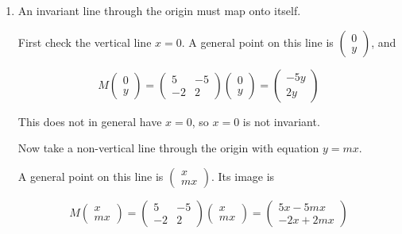 \documentclass[leqno]{article}
\begin{document}
\begin{enumerate}[
  label=\textbf{\arabic*.},
  leftmargin=*,
  topsep=0pt,
  partopsep=0pt,
  parsep=0pt
]
\begin{tcolorbox}[colback=white, colframe=scarlet, title={\textbf{Solution}}, breakable, grow to left by=6mm, grow to right by=10mm]
\begin{enumerate}[label=\textbf{(\alph*)}]
  \[
  \det(M)=
  \begin{vmatrix}
  p+2 & -5\\
  -2 & p-1
  \end{vmatrix}
  =(p+2)(p-1)-(-5)(-2)
  \]

  \[
  \det(M)=(p+2)(p-1)-10=p^2+p-2-10=p^2+p-12
  \]

  Factorising,

  \[
  p^2+p-12=(p+4)(p-3)
  \]

  So \(T\) is not invertible when

  \[
  (p+4)(p-3)=0
  \]

  Hence \(p=3\) or \(p=-4\).

  \item An invariant line through the origin must map onto itself.

  First check the vertical line \(x=0\). A general point on this line is \(\begin{pmatrix}0\\y\end{pmatrix}\), and

  \[
  M\begin{pmatrix}0\\y\end{pmatrix}
  =
  \begin{pmatrix}
  5 & -5\\
  -2 & 2
  \end{pmatrix}
  \begin{pmatrix}0\\y\end{pmatrix}
  =
  \begin{pmatrix}-5y\\2y\end{pmatrix}
  \]

  This does not in general have \(x=0\), so \(x=0\) is not invariant.

  Now take a non-vertical line through the origin with equation \(y=mx\).

  A general point on this line is \(\begin{pmatrix}x\\mx\end{pmatrix}\). Its image is

  \[
  M\begin{pmatrix}x\\mx\end{pmatrix}
  =
  \begin{pmatrix}
  5 & -5\\
  -2 & 2
  \end{pmatrix}
  \begin{pmatrix}x\\mx\end{pmatrix}
  =
  \begin{pmatrix}
  5x-5mx\\
  -2x+2mx
  \end{pmatrix}
  \]


\end{enumerate}
\end{tcolorbox}
\end{enumerate}
\end{document}
